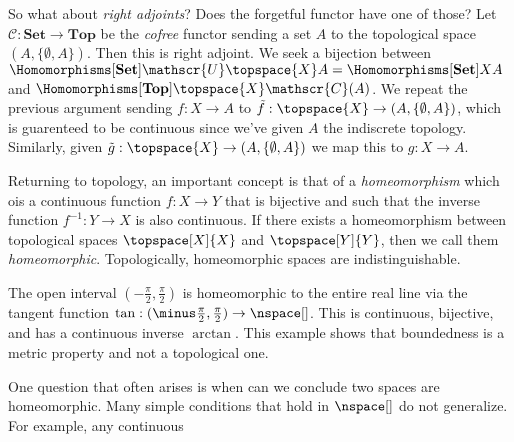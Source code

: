 \documentclass{book}                                                           %
\begin{document}
                \par\hfill\par
                So what about \textit{right adjoints}? Does the forgetful
                functor have one of those? Let
                $\mathscr{C}:\textbf{Set}\rightarrow\textbf{Top}$ be the
                \textit{cofree} functor sending a set $A$ to the topological
                space $(A,\{\emptyset,A\})$. Then this is right adjoint. We seek
                a bijection between
                $\Homomorphisms[\textbf{Set}]{\mathscr{U}\topspace{X}}{A}%
                =\Homomorphisms[\textbf{Set}]{X}{A}$ and
                $\Homomorphisms[\textbf{Top}]{\topspace{X}}{\mathscr{C}(A)}$. We
                repeat the previous argument sending $f:X\rightarrow{A}$ to
                $\tilde{f}:\topspace{X}\rightarrow(A,\{\emptyset,A\})$, which is
                guarenteed to be continuous since we've given $A$ the indiscrete
                topology. Similarly, given
                $\tilde{g}:\topspace{X}\rightarrow(A,\{\emptyset,A\})$ we map
                this to $g:X\rightarrow{A}$.
                \par\hfill\par
                Returning to topology, an important concept is that of a
                \textit{homeomorphism} which ois a continuous function
                $f:X\rightarrow{Y}$ that is bijective and such that the inverse
                function $f^{\minus{1}}:Y\rightarrow{X}$ is also continuous.
                If there exists a homeomorphism between topological spaces
                $\topspace[X]{X}$ and $\topspace[Y]{Y}$, then we call them
                \textit{homeomorphic}. Topologically, homeomorphic spaces are
                indistinguishable.
                \begin{example}
                    The open interval $(\minus\frac{\pi}{2},\frac{\pi}{2})$ is
                    homeomorphic to the entire real line via the tangent
                    function $\tan:(\minus\frac{\pi}{2},\frac{\pi}{2})%
                    \rightarrow\nspace[]$. This is continuous, bijective, and
                    has a continuous inverse $\arctan$. This example shows that
                    boundedness is a metric property and not a topological one.
                \end{example}
                One question that often arises is when can we conclude two
                spaces are homeomorphic. Many simple conditions that hold in
                $\nspace[]$ do not generalize. For example, any continuous
\end{document}
